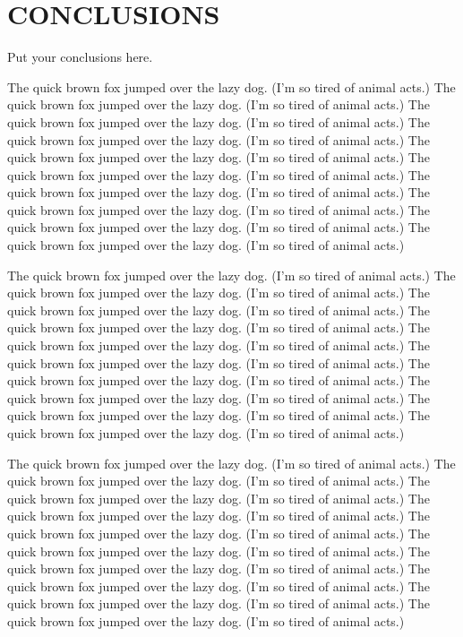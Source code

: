 \chapter{CONCLUSIONS}\label{chap6:conclusions}

Put your conclusions here. 


The quick brown fox jumped over the lazy dog.
(I'm so tired of animal acts.)
The quick brown fox jumped over the lazy dog.
(I'm so tired of animal acts.)
The quick brown fox jumped over the lazy dog.
(I'm so tired of animal acts.)
The quick brown fox jumped over the lazy dog.
(I'm so tired of animal acts.)
The quick brown fox jumped over the lazy dog.
(I'm so tired of animal acts.)
The quick brown fox jumped over the lazy dog.
(I'm so tired of animal acts.)
The quick brown fox jumped over the lazy dog.
(I'm so tired of animal acts.)
The quick brown fox jumped over the lazy dog.
(I'm so tired of animal acts.)
The quick brown fox jumped over the lazy dog.
(I'm so tired of animal acts.)
The quick brown fox jumped over the lazy dog.
(I'm so tired of animal acts.)



The quick brown fox jumped over the lazy dog.
(I'm so tired of animal acts.)
The quick brown fox jumped over the lazy dog.
(I'm so tired of animal acts.)
The quick brown fox jumped over the lazy dog.
(I'm so tired of animal acts.)
The quick brown fox jumped over the lazy dog.
(I'm so tired of animal acts.)
The quick brown fox jumped over the lazy dog.
(I'm so tired of animal acts.)
The quick brown fox jumped over the lazy dog.
(I'm so tired of animal acts.)
The quick brown fox jumped over the lazy dog.
(I'm so tired of animal acts.)
The quick brown fox jumped over the lazy dog.
(I'm so tired of animal acts.)
The quick brown fox jumped over the lazy dog.
(I'm so tired of animal acts.)
The quick brown fox jumped over the lazy dog.
(I'm so tired of animal acts.)



The quick brown fox jumped over the lazy dog.
(I'm so tired of animal acts.)
The quick brown fox jumped over the lazy dog.
(I'm so tired of animal acts.)
The quick brown fox jumped over the lazy dog.
(I'm so tired of animal acts.)
The quick brown fox jumped over the lazy dog.
(I'm so tired of animal acts.)
The quick brown fox jumped over the lazy dog.
(I'm so tired of animal acts.)
The quick brown fox jumped over the lazy dog.
(I'm so tired of animal acts.)
The quick brown fox jumped over the lazy dog.
(I'm so tired of animal acts.)
The quick brown fox jumped over the lazy dog.
(I'm so tired of animal acts.)
The quick brown fox jumped over the lazy dog.
(I'm so tired of animal acts.)
The quick brown fox jumped over the lazy dog.
(I'm so tired of animal acts.)


